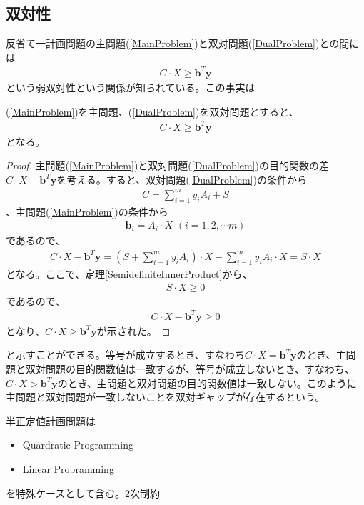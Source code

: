 \subsection{双対性}
反省て一計画問題の主問題(\ref{MainProblem})と双対問題(\ref{DualProblem})との間には
\begin{align*}
  C \cdot X \geq \mathbf{b}^T \mathbf{y}
\end{align*}
という弱双対性という関係が知られている。この事実は
\begin{theorem*}
  (\ref{MainProblem})を主問題、(\ref{DualProblem})を双対問題とすると、
  \begin{align*}
    C \cdot X \geq \mathbf{b}^T \mathbf{y}
  \end{align*}
  となる。
\end{theorem*}
\begin{proof}
  主問題(\ref{MainProblem})と双対問題(\ref{DualProblem})の目的関数の差$C \cdot X - \mathbf{b}^T \mathbf{y}$を考える。すると、双対問題(\ref{DualProblem})の条件から
  \begin{align*}
    C = \displaystyle{\sum_{i = 1}^m} y_i A_i + S
  \end{align*}
  、主問題(\ref{MainProblem})の条件から
  \begin{align*}
    \mathbf{b}_i = A_i \cdot X \,\, (i = 1, 2, \cdots m)
  \end{align*}
  であるので、
  \begin{align*}
    C \cdot X - \mathbf{b}^T \mathbf{y} = \left(S + \displaystyle{\sum_{i = 1}^m} y_i A_i\right) \cdot X - \displaystyle{\sum_{i = 1}^m} y_i A_i \cdot X = S \cdot X
  \end{align*}
  となる。ここで、定理\ref{SemidefiniteInnerProduct}から、
  \begin{align*}
    S \cdot X \geq 0
  \end{align*}
  であるので、
  \begin{align*}
    C \cdot X - \mathbf{b}^T \mathbf{y} \geq 0
  \end{align*}
  となり、$C \cdot X \geq \mathbf{b}^T \mathbf{y}$が示された。
\end{proof}
と示すことができる。等号が成立するとき、すなわち$C \cdot X = \mathbf{b}^T \mathbf{y}$のとき、主問題と双対問題の目的関数値は一致するが、等号が成立しないとき、すなわち、$C \cdot X > \mathbf{b}^T \mathbf{y}$のとき、主問題と双対問題の目的関数値は一致しない。このように主問題と双対問題が一致しないことを双対ギャップが存在するという。

半正定値計画問題は
\begin{itemize}
  \item Quardratic Programming
  \item Linear Probramming
\end{itemize}
を特殊ケースとして含む。2次制約


